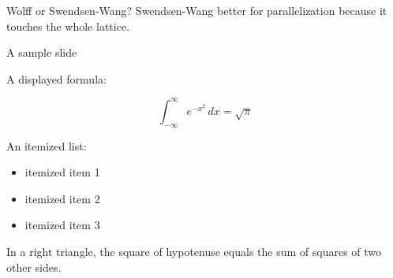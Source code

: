\documentclass[handout]{beamer}
\begin{document}
\begin{frame}{Wolff or Swendsen-Wang?}
Swendsen-Wang better for parallelization because it touches the whole lattice.
\end{frame}




\begin{frame}{A sample slide}

A displayed formula:

\[
  \int_{-\infty}^\infty e^{-x^2} \, dx = \sqrt{\pi}
\]

An itemized list:

\begin{itemize}
  \item itemized item 1
  \item itemized item 2
  \item itemized item 3
\end{itemize}

\begin{theorem}
  In a right triangle, the square of hypotenuse equals
  the sum of squares of two other sides.
\end{theorem}

\end{frame}
\end{document}
